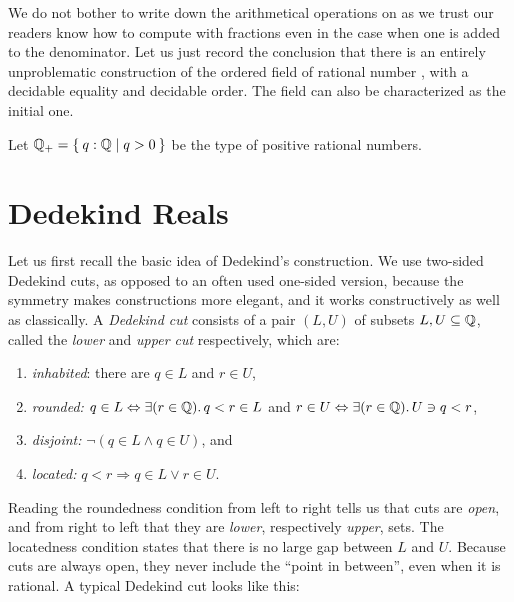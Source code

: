 We do not bother to write down the arithmetical operations on \Q as we trust our readers
know how to compute with fractions even in the case when one is added to the denominator.
Let us just record the conclusion that there is an entirely unproblematic construction of
the ordered field of rational number \Q, with a decidable equality and decidable order.
The field \Q can also be characterized as the initial one.

Let $\Qp = \setof{ q : \Q | q > 0 }$ be the type of positive rational numbers.

\section{Dedekind Reals}
\label{sec:dedekind-reals}

Let us first recall the basic idea of Dedekind's construction. We use two-sided Dedekind
cuts, as opposed to an often used one-sided version, because the symmetry makes
constructions more elegant, and it works constructively as well as classically. A
\emph{Dedekind cut} consists of a pair $(L, U)$ of subsets $L, U \subseteq \mathbb{Q}$, called the
\emph{lower} and \emph{upper cut} respectively, which are:
% 
\begin{enumerate}
\item \emph{inhabited}: there are $q \in L$ and $r \in U$,
\item \emph{rounded:} $q \in L \Leftrightarrow \exis {r \in \Q} q < r \in L$
  and $r \in U \Leftrightarrow \exis {r \in \Q} U \ni q < r$,
\item \emph{disjoint:} $\lnot (q \in L \land q \in U)$, and
\item \emph{located:} $q < r \Rightarrow q \in L \lor r \in U$.
\end{enumerate}
%
Reading the roundedness condition from left to right tells us that cuts are \emph{open},
and from right to left that they are \emph{lower}, respectively \emph{upper}, sets. The
locatedness condition states that there is no large gap between $L$ and $U$. Because cuts
are always open, they never include the ``point in between'', even when it is rational. A
typical Dedekind cut looks like this:
%
\begin{center}
\end{center}
